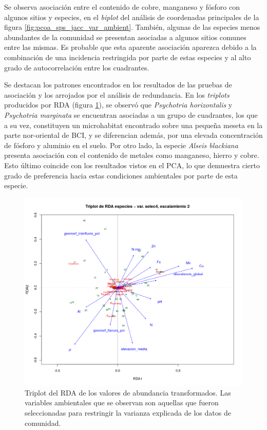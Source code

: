 \documentclass[11pt,]{article}
\begin{document}
Se observa asociación entre el contenido de cobre, manganeso y fósforo
con algunos sitios y especies, en el \emph{biplot} del análisis de
coordenadas principales de la figura
\ref{fig:pcoa_sps_jacc_var_ambient}. También, algunas de las especies
menos abundantes de la comunidad se presentan asociadas a algunos sitios
comunes entre las mismas. Es probable que esta aparente asociación
aparezca debido a la combinación de una incidencia restringida por parte
de estas especies y al alto grado de autocorrelación entre los
cuadrantes.

Se destacan los patrones encontrados en los resultados de las pruebas de
asociación y los arrojados por el análisis de redundancia. En los
\emph{triplots} producidos por RDA (figura
\ref{fig:rda_triplot_var_selec_4_escal2}), se observó que
\emph{Psychotria horizontalis} y \emph{Psychotria marginata} se
encuentran asociadas a un grupo de cuadrantes, los que a su vez,
constituyen un microhabitat encontrado sobre una pequeña meseta en la
parte nor-oriental de BCI, y se diferencian además, por una elevada
concentración de fósforo y aluminio en el suelo. Por otro lado, la
especie \emph{Alseis blackiana} presenta asociación con el contenido de
metales como manganeso, hierro y cobre. Esto último coincide con los
resultados vistos en el PCA, lo que demuestra cierto grado de
preferencia hacia estas condiciones ambientales por parte de esta
especie.

\begin{figure}
\centering
\includegraphics[height=0.70000\textwidth]{rda_triplot_var_selec_4_escal2.png}
\caption{Triplot del RDA de los valores de abundancia transformados. Las
variables ambientales que se observan son aquellas que fueron
seleccionadas para restringir la varianza explicada de los datos de
comunidad. \label{fig:rda_triplot_var_selec_4_escal2}}
\end{figure}
\end{document}
